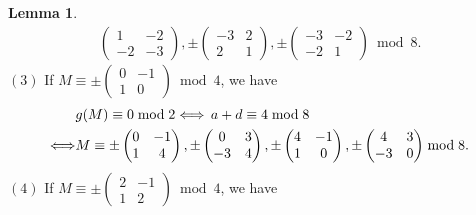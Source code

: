 \documentclass[12pt]{article}
\theoremstyle{definition}
\newtheorem{lemma}[theorem]{Lemma}
\numberwithin{equation}{section}
\numberwithin{theorem}{section}
\begin{document}
\begin{lemma}
{\begin{align}
\begin{pmatrix}
1 & -2 \\
-2 & -3
\end{pmatrix}, 
\pm
\begin{pmatrix}
-3 & 2 \\
2 & 1
\end{pmatrix}, 
\pm
\begin{pmatrix}
-3 & -2 \\
-2 & 1
\end{pmatrix} 
\bmod{8}.
\end{align}
$\mathrm{(3)}$ If 
$
M
\equiv
\pm
\begin{pmatrix}
0 & -1 \\
1 & 0
\end{pmatrix}
\bmod{4}
$,  
we have 
\begin{align}
&g(M)\equiv 0 \bmod{2} 
\Longleftrightarrow
\, a+d\equiv 4 \bmod{8}  \notag \\
\Longleftrightarrow&
M
\equiv
\pm
\begin{pmatrix}
0 & -1 \\
1 & 4
\end{pmatrix}, 
\pm
\begin{pmatrix}
0 & 3 \\
-3 & 4
\end{pmatrix}, 
\pm
\begin{pmatrix}
4 & -1 \\
1 & 0
\end{pmatrix}, 
\pm
\begin{pmatrix}
4 & 3 \\
-3 & 0
\end{pmatrix}
 \bmod{8}.   \label{eqn:level4-mod4-pmT}
\end{align}
$\mathrm{(4)}$ If 
$
M
\equiv
\pm
\begin{pmatrix}
2 & -1 \\
1 & 2
\end{pmatrix}
\bmod{4}
$, we have  
\begin{align}

\end{align}}
\end{lemma}
\end{document}
